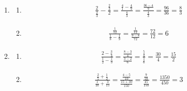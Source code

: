 \documentclass{article}
\begin{document}
\begin{enumerate}
\begin{enumerate}
\begin{align*}
			             = \left(\frac{1}{6}\right)\left(\frac{5}{6}\right)                           
			             = \frac{5}{36}
		            \end{align*}
	      \end{enumerate}
	\item
	      \begin{enumerate}
		      \item
		            \begin{align*}
			            \frac{2}{\frac{2}{3}} - \frac{\frac{2}{3}}{2}   
			             = \frac{\frac{4}{1} - \frac{4}{9}}{\frac{4}{3}} 
			             = \frac{\frac{36 - 4}{9}}{\frac{4}{3}}          
			             = \frac{96}{36}                                 
			             = \frac{8}{3}
		            \end{align*}

		      \item
		            \begin{align*}
			            \frac{\frac{1}{12}}{\frac{1}{8} - \frac{1}{9}} 
			             = \frac{\frac{1}{12}}{\frac{9 - 8}{72}}        
			             = \frac{72}{12}                                
			             = 6
		            \end{align*}
	      \end{enumerate}
	\item
	      \begin{enumerate}
		      \item
		            \begin{align*}
			            \frac{2 - \frac{3}{4}}{\frac{1}{2} - \frac{1}{3}} 
			             = \frac{\frac{8 - 3}{4}}{\frac{3 - 2}{6}}         
			             = \frac{\frac{5}{4}}{\frac{1}{6}}                 
			             = \frac{30}{4}                                    
			             = \frac{15}{2}
		            \end{align*}
		      \item
		            \begin{align*}
			            \frac{\frac{2}{5} + \frac{1}{2}}{\frac{1}{10} + \frac{3}{15}} 
			             = \frac{\frac{4 - 5}{10}}{\frac{15 + 30}{150}}                
			             = \frac{\frac{9}{10}}{\frac{45}{150}}                         
			             = \frac{1350}{450}                                            
			             = 3
		            \end{align*}
	      \end{enumerate}

\end{enumerate}
\end{document}
